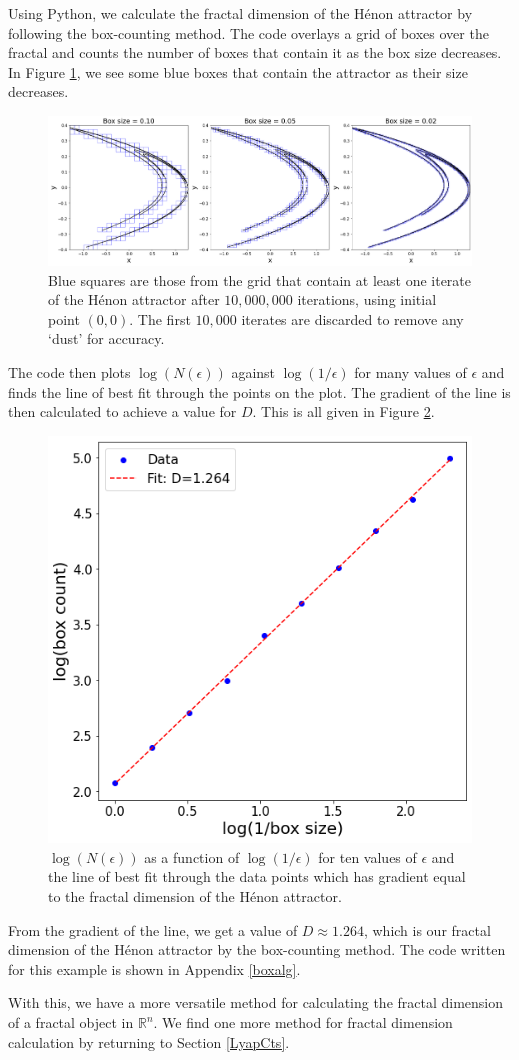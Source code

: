 \begin{exmp}\label{henonboxex}
    Using Python, we calculate the fractal dimension of the Hénon attractor by following the box-counting method. The code overlays a grid of boxes over the fractal and counts the number of boxes that contain it as the box size decreases. In Figure \ref{fig:Henon4}, we see some blue boxes that contain the attractor as their size decreases.
    \begin{figure}
        \centering
        \includegraphics[width=1\linewidth]{Images/Henon boxes.png}
        \caption{Blue squares are those from the grid that contain at least one iterate of the Hénon attractor after $10,000,000$ iterations, using initial point $(0,0)$. The first $10,000$ iterates are discarded to remove any `dust' for accuracy.}
        \label{fig:Henon4}
    \end{figure}
    The code then plots $\log (N(\epsilon))$ against $\log (1/\epsilon)$ for many values of $\epsilon$ and finds the line of best fit through the points on the plot. The gradient of the line is then calculated to achieve a value for $D$. This is all given in Figure \ref{fig:Henon5}.
    \begin{figure}
        \centering
        \includegraphics[width=0.5\linewidth]{Images/henon loglog.png}
        \caption{$\log (N(\epsilon))$ as a function of $\log(1/\epsilon)$ for ten values of $\epsilon$ and the line of best fit through the data points which has gradient equal to the fractal dimension of the Hénon attractor.}
        \label{fig:Henon5}
    \end{figure}
    From the gradient of the line, we get a value of $D\approx1.264$, which is our fractal dimension of the Hénon attractor by the box-counting method. The code written for this example is shown in Appendix \ref{boxalg}.
\end{exmp}
With this, we have a more versatile method for calculating the fractal dimension of a fractal object in $\mathbb{R}^n$. We find one more method for fractal dimension calculation by returning to Section \ref{LyapCts}.



